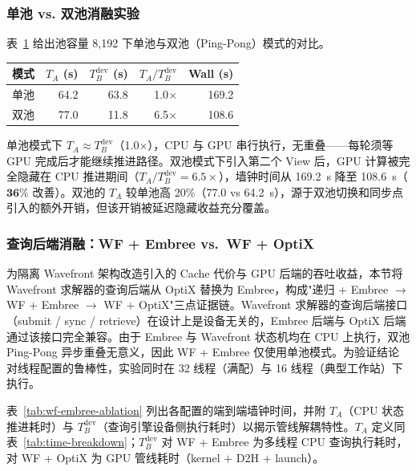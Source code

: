 \subsubsection{单池 vs. 双池消融实验}

表~\ref{tab:single-dual} 给出池容量 8{,}192 下单池与双池（Ping-Pong）模式的对比。

\begin{table}[htbp]
  \centering
  \label{tab:single-dual}
  \small
  \begin{tabular}{lrrrr}
    \toprule
    模式 & $T_A$ (s) & $T_B^{\text{dev}}$ (s) & $T_A / T_B^{\text{dev}}$ & Wall (s) \\
    \midrule
    单池 & 64.2  & 63.8 & 1.0$\times$ & 169.2 \\
    双池 & 77.0  & 11.8 & 6.5$\times$ & 108.6 \\
    \bottomrule
  \end{tabular}
\end{table}

单池模式下 $T_A \approx T_B^{\text{dev}}$（1.0$\times$），CPU 与 GPU 串行执行，无重叠——每轮须等 GPU 完成后才能继续推进路径。双池模式下引入第二个 View 后，GPU 计算被完全隐藏在 CPU 推进期间（$T_A / T_B^{\text{dev}} = 6.5\times$），墙钟时间从 169.2~s 降至 108.6~s（$\mathbf{36\%}$ 改善）。双池的 $T_A$ 较单池高 20\%（77.0 vs 64.2~s），源于双池切换和同步点引入的额外开销，但该开销被延迟隐藏收益充分覆盖。

\subsubsection{查询后端消融：WF + Embree vs.\ WF + OptiX}
\label{sec:wf-embree-ablation}

为隔离 Wavefront 架构改造引入的 Cache 代价与 GPU 后端的吞吐收益，本节将 Wavefront 求解器的查询后端从 OptiX 替换为 Embree，构成"递归 + Embree $\to$ WF + Embree $\to$ WF + OptiX"三点证据链。Wavefront 求解器的查询后端接口（submit / sync / retrieve）在设计上是设备无关的，Embree 后端与 OptiX 后端通过该接口完全兼容。由于 Embree 与 Wavefront 状态机均在 CPU 上执行，双池 Ping-Pong 异步重叠无意义，因此 WF + Embree 仅使用单池模式。为验证结论对线程配置的鲁棒性，实验同时在 32 线程（满配）与 16 线程（典型工作站）下执行。

表~\ref{tab:wf-embree-ablation} 列出各配置的端到端墙钟时间，并附 $T_A$（CPU 状态推进耗时）与 $T_B^{\text{dev}}$（查询引擎设备侧执行耗时）以揭示管线解耦特性。$T_A$ 定义同表~\ref{tab:time-breakdown}；$T_B^{\text{dev}}$ 对 WF + Embree 为多线程 CPU 查询执行耗时，对 WF + OptiX 为 GPU 管线耗时（kernel $+$ D2H $+$ launch）。

